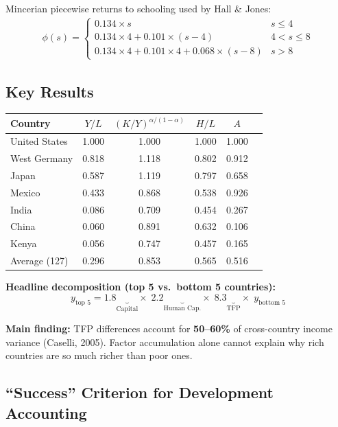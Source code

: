 \documentclass[a4paper,11pt]{article}
\begin{document}
Mincerian piecewise returns to schooling used by Hall \& Jones:
\begin{align*}
\phi(s) = \begin{cases}
0.134 \times s & s \leq 4 \\
0.134 \times 4 + 0.101 \times (s-4) & 4 < s \leq 8 \\
0.134 \times 4 + 0.101 \times 4 + 0.068 \times (s-8) & s > 8
\end{cases}
\end{align*}

\subsection*{Key Results}

\begin{center}
\begin{tabular}{lccccc}
\toprule
Country & $Y/L$ & $(K/Y)^{\alpha/(1-\alpha)}$ & $H/L$ & $A$ \\
\midrule
United States & 1.000 & 1.000 & 1.000 & 1.000 \\
West Germany & 0.818 & 1.118 & 0.802 & 0.912 \\
Japan & 0.587 & 1.119 & 0.797 & 0.658 \\
Mexico & 0.433 & 0.868 & 0.538 & 0.926 \\
India & 0.086 & 0.709 & 0.454 & 0.267 \\
China & 0.060 & 0.891 & 0.632 & 0.106 \\
Kenya & 0.056 & 0.747 & 0.457 & 0.165 \\
\midrule
Average (127) & 0.296 & 0.853 & 0.565 & 0.516 \\
\bottomrule
\end{tabular}
\end{center}

\medskip
\textbf{Headline decomposition (top 5 vs.\ bottom 5 countries):}
\[
y_{\text{top 5}} = 1.8\underbrace{}_{\text{Capital}} \times\; 2.2\underbrace{}_{\text{Human Cap.}} \times\; 8.3\underbrace{}_{\text{TFP}} \times\; y_{\text{bottom 5}}
\]

\begin{resultbox}
\textbf{Main finding:} TFP differences account for \textbf{50--60\%} of cross-country income variance (Caselli, 2005). Factor accumulation alone cannot explain why rich countries are so much richer than poor ones.
\end{resultbox}

\subsection*{``Success'' Criterion for Development Accounting}
\end{document}
